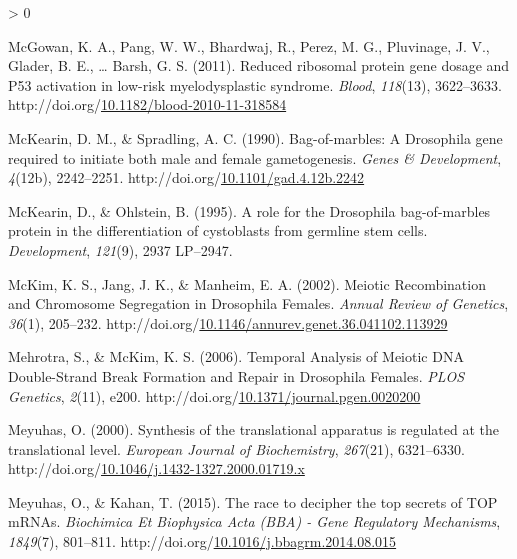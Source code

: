\documentclass[12pt,oneside]{reedthesis}
\newlength{\cslhangindent}
\newenvironment{CSLReferences}[2] %
 {%
  \setlength{\parindent}{0pt}
  \ifodd #1 \everypar{\setlength{\hangindent}{\cslhangindent}}\ignorespaces\fi
  \ifnum #2 > 0
  \setlength{\parskip}{#2\baselineskip}
  \fi
 }%
 {}
\begin{document}
\begin{CSLReferences}{1}{0}
\leavevmode\hypertarget{ref-mcgowanReducedRibosomalProtein2011}{}%
McGowan, K. A., Pang, W. W., Bhardwaj, R., Perez, M. G., Pluvinage, J. V., Glader, B. E., \ldots{} Barsh, G. S. (2011). Reduced ribosomal protein gene dosage and P53 activation in low-risk myelodysplastic syndrome. \emph{Blood}, \emph{118}(13), 3622--3633. http://doi.org/\href{https://doi.org/10.1182/blood-2010-11-318584}{10.1182/blood-2010-11-318584}

\leavevmode\hypertarget{ref-McKearin1990e}{}%
McKearin, D. M., \& Spradling, A. C. (1990). Bag-of-marbles: A {Drosophila} gene required to initiate both male and female gametogenesis. \emph{Genes \& Development}, \emph{4}(12b), 2242--2251. http://doi.org/\href{https://doi.org/10.1101/gad.4.12b.2242}{10.1101/gad.4.12b.2242}

\leavevmode\hypertarget{ref-McKearin1995b}{}%
McKearin, D., \& Ohlstein, B. (1995). A role for the {Drosophila} bag-of-marbles protein in the differentiation of cystoblasts from germline stem cells. \emph{Development}, \emph{121}(9), 2937 LP--2947.

\leavevmode\hypertarget{ref-mckimMeioticRecombinationChromosome2002}{}%
McKim, K. S., Jang, J. K., \& Manheim, E. A. (2002). Meiotic {Recombination} and {Chromosome Segregation} in {Drosophila Females}. \emph{Annual Review of Genetics}, \emph{36}(1), 205--232. http://doi.org/\href{https://doi.org/10.1146/annurev.genet.36.041102.113929}{10.1146/annurev.genet.36.041102.113929}

\leavevmode\hypertarget{ref-mehrotraTemporalAnalysisMeiotic2006}{}%
Mehrotra, S., \& McKim, K. S. (2006). Temporal {Analysis} of {Meiotic DNA Double-Strand Break Formation} and {Repair} in {Drosophila Females}. \emph{PLOS Genetics}, \emph{2}(11), e200. http://doi.org/\href{https://doi.org/10.1371/journal.pgen.0020200}{10.1371/journal.pgen.0020200}

\leavevmode\hypertarget{ref-meyuhasSynthesisTranslationalApparatus2000}{}%
Meyuhas, O. (2000). Synthesis of the translational apparatus is regulated at the translational level. \emph{European Journal of Biochemistry}, \emph{267}(21), 6321--6330. http://doi.org/\href{https://doi.org/10.1046/j.1432-1327.2000.01719.x}{10.1046/j.1432-1327.2000.01719.x}

\leavevmode\hypertarget{ref-meyuhasRaceDecipherTop2015}{}%
Meyuhas, O., \& Kahan, T. (2015). The race to decipher the top secrets of {TOP mRNAs}. \emph{Biochimica Et Biophysica Acta (BBA) - Gene Regulatory Mechanisms}, \emph{1849}(7), 801--811. http://doi.org/\href{https://doi.org/10.1016/j.bbagrm.2014.08.015}{10.1016/j.bbagrm.2014.08.015}


\end{CSLReferences}
\end{document}
